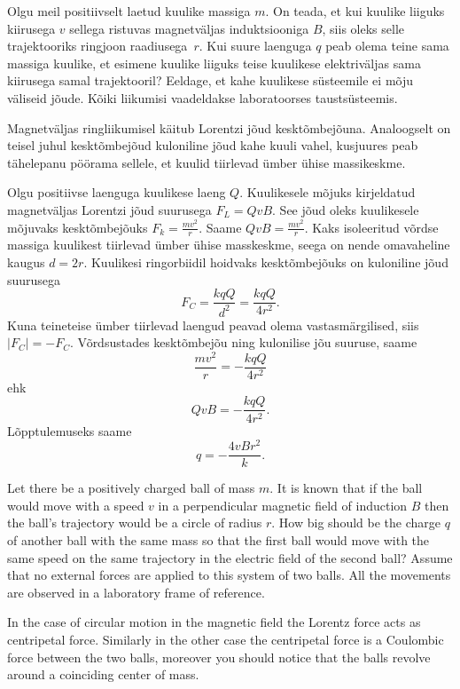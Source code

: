 
Olgu meil positiivselt laetud kuulike massiga $m$. On teada, et kui kuulike
liiguks kiirusega $v$ sellega ristuvas magnetväljas induktsiooniga $B$,
siis oleks selle trajektooriks ringjoon raadiusega~$r$. Kui suure laenguga $q$ peab olema teine sama massiga kuulike, et esimene
kuulike liiguks teise kuulikese elektriväljas sama kiirusega samal trajektooril? Eeldage, et
kahe kuulikese süsteemile ei mõju väliseid jõude. Kõiki liikumisi vaadeldakse
laboratoorses taustsüsteemis.
\pagebreak

\hint
Magnetväljas ringliikumisel käitub Lorentzi jõud kesktõmbejõuna. Analoogselt on teisel juhul kesktõmbejõud kuloniline jõud kahe kuuli vahel, kusjuures peab tähelepanu pöörama sellele, et kuulid tiirlevad ümber ühise massikeskme.

\solu
Olgu positiivse laenguga kuulikese laeng $Q$. Kuulikesele mõjuks kirjeldatud magnetväljas Lorentzi jõud suurusega $F_L=QvB$. See jõud oleks kuulikesele mõjuvaks kesktõmbejõuks $F_k=\frac{mv^2}{r}$. Saame $QvB=\frac{mv^2}{r}$. Kaks isoleeritud võrdse massiga kuulikest tiirlevad ümber ühise masskeskme, seega on nende omavaheline kaugus $d=2r$. Kuulikesi ringorbiidil hoidvaks kesktõmbejõuks on kuloniline jõud suurusega 
\[
F_C=\frac{kqQ}{d^2}=\frac{kqQ}{4r^2}.
\]
Kuna teineteise ümber tiirlevad laengud peavad olema vastasmärgilised, siis $|F_C|=-F_C$. Võrdsustades kesktõmbejõu ning kulonilise jõu suuruse, saame
\[
\frac{mv^2}{r}=-\frac{kqQ}{4r^2}
\]
ehk
\[
QvB=-\frac{kqQ}{4r^2}.
\]
Lõpptulemuseks saame 
\[
q=-\frac{4vBr^2}{k}.
\]

Let there be a positively charged ball of mass $m$. It is known that if the ball would move with a speed $v$ in a perpendicular magnetic field of induction $B$ then the ball’s trajectory would be a circle of radius $r$. How big should be the charge $q$ of another ball with the same mass so that the first ball would move with the same speed on the same trajectory in the electric field of the second ball? Assume that no external forces are applied to this system of two balls. All the movements are observed in a laboratory frame of reference.

\hinteng
In the case of circular motion in the magnetic field the Lorentz force acts as centripetal force. Similarly in the other case the centripetal force is a Coulombic force between the two balls, moreover you should notice that the balls revolve around a coinciding center of mass.

